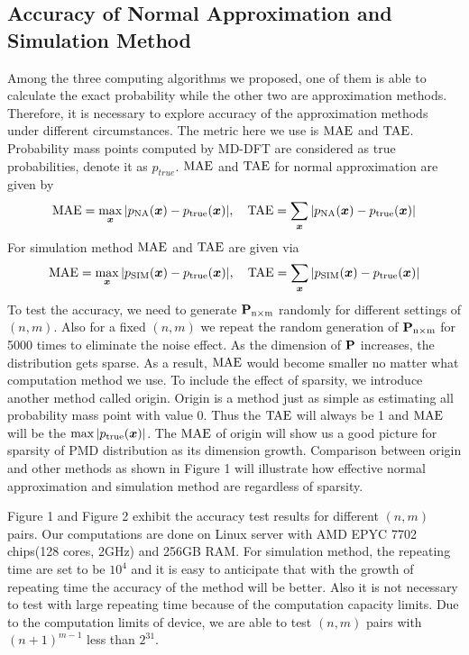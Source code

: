 \documentclass[12pt]{article}
\newcommand{\TAE}{{\rm TAE}}
\newcommand{\MAE}{{\rm MAE}}
\newcommand{\PMD}{\textrm{PMD}}
\newcommand{\xvec}{\boldsymbol{x}}
\begin{document}
\subsection{Accuracy of Normal Approximation and Simulation Method}
Among the three computing algorithms we proposed, one of them is able to calculate the exact probability while the other two are approximation methods. Therefore, it is necessary to explore accuracy of the approximation methods under different circumstances. The metric here we use is $\MAE$ and $\TAE$. Probability mass points computed by MD-DFT are considered as true probabilities, denote it as $p_{true}$.
$\MAE$ and $\TAE$ for normal approximation are given by
\begin{equation*}
    \MAE = \max_{\xvec}|p_{\rm NA}(\xvec)-p_{\rm true}(\xvec)|, \quad  \TAE = \sum_{\xvec}|p_{\rm NA}(\xvec)-p_{\rm true}(\xvec)|
\end{equation*}
For simulation method $\MAE$ and $\TAE$ are given via
\begin{equation*}
    \MAE = \max_{\xvec}|p_{\rm SIM}(\xvec)-p_{\rm true}(\xvec)|, \quad  \TAE = \sum_{\xvec}|p_{\rm SIM
    }(\xvec)-p_{\rm true}(\xvec)|
\end{equation*}
To test the accuracy, we need to generate $\boldsymbol{\rm P}_{\rm n \times \rm m}$ randomly for different settings of $(n,m)$. Also for a fixed $(n,m)$ we repeat the random generation of $\boldsymbol{\rm P}_{\rm n \times \rm m}$ for 5000 times to eliminate the noise effect. As the dimension of $\boldsymbol{\rm P}$ increases, the distribution gets sparse. As a result, $\MAE$ would become smaller no matter what computation method we use. To include the effect of sparsity, we introduce another method called origin. Origin is a method just as simple as estimating all probability mass point with value 0. Thus the $\TAE$ will always be 1 and $\MAE$ will be the $\max |p_{\rm true}(\xvec)|$. The $\MAE$ of origin will show us a good picture for sparsity of $\PMD$ distribution as its dimension growth. Comparison between origin and other methods as shown in Figure 1 will illustrate how effective normal approximation and simulation method are regardless of sparsity.



Figure 1 and Figure 2 exhibit the accuracy test results for different $(n,m)$ pairs. Our computations are done on Linux server with AMD EPYC 7702 chips(128 cores, 2GHz) and 256GB RAM. For simulation method, the repeating time are set to be $10^4$ and it is easy to anticipate that with the growth of repeating  time the accuracy of the method will be better. Also it is not necessary to test with large repeating time because of the computation capacity limits. Due to the computation limits of device, we are able to test $(n,m)$ pairs with $(n+1)^{m-1}$ less than $2^{31}$.
\end{document}
